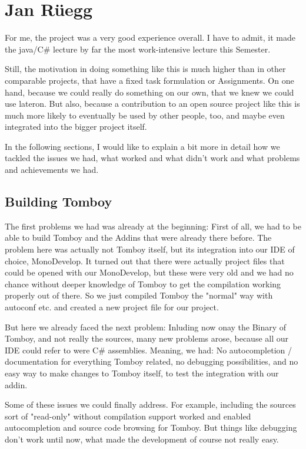 \documentclass[11pt,a4paper,titlepage]{article}
\begin{document}


\section{Jan Rüegg}

For me, the project was a very good experience overall. I have to admit, it made the java/C\# lecture by far the most work-intensive lecture this Semester.

Still, the motivation in doing something like this is much higher than in other comparable projects, that have a fixed task formulation or Assignments. On one hand, because we could really do something on our own, that we knew we could use lateron. But also, because a contribution to an open source project like this is much more likely to eventually be used by other people, too, and maybe even integrated into the bigger project itself.

In the following sections, I would like to explain a bit more in detail how we tackled the issues we had, what worked and what didn't work and what problems and achievements we had.

\subsection{Building Tomboy}
The first problems we had was already at the beginning: First of all, we had to be able to build Tomboy and the Addins that were already there before. The problem here was actually not Tomboy itself, but its integration into our IDE of choice, MonoDevelop. It turned out that there were actually project files that could be opened with our MonoDevelop, but these were very old and we had no chance without deeper knowledge of Tomboy to get the compilation working properly out of there. So we just compiled Tomboy the "normal" way with autoconf etc. and created a new project file for our project.

But here we already faced the next problem: Inluding now onay the Binary of Tomboy, and not really the sources, many new problems arose, because all our IDE could refer to were C\# assemblies. Meaning, we had: No autocompletion / documentation for everything Tomboy related, no debugging possibilities, and no easy way to make changes to Tomboy itself, to test the integration with our addin.

Some of these issues we could finally address. For example, including the sources sort of "read-only" without compilation support worked and enabled autocompletion and source code browsing for Tomboy. But things like debugging don't work until now, what made the development of course not really easy.
\end{document}
